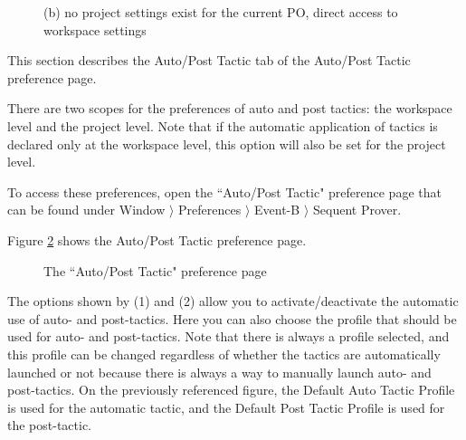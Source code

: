 \begin{figure}
\begin{minipage}[t]{.45\linewidth}
 \centering {}
 \caption{(a) direct access to the Celebrity project specific settings}
 \label{fig_ref_01_proving_perspective13}
\end{minipage}\hfill
\begin{minipage}[t]{.45\linewidth}
\centering {}
\caption{(b) no project settings exist for the current PO, direct access to workspace settings}
 \label{fig_ref_01_proving_perspective14}
\end{minipage}
\end{figure}

This section describes the \textsf{Auto/Post Tactic} tab of the \textsf{Auto/Post Tactic} preference page.

There are two scopes for the preferences of auto and post tactics: the workspace level and the project level. Note that if the automatic application of tactics is declared only at the workspace level, this option will also be set for the project level.

To access these preferences, open the ``Auto/Post Tactic" preference page that can be found under \textsf{Window $\rangle$ Preferences $\rangle$ Event-B $\rangle$ Sequent Prover}.

Figure \ref{fig_ref_01_preferences7} shows the \textsf{Auto/Post Tactic} preference page.

\begin{figure}[!ht]
\begin{center}
	\caption{The ``Auto/Post Tactic" preference page}
	\label{fig_ref_01_preferences7}
\end{center}
\end{figure}

The options shown by (1) and (2) allow you to activate/deactivate the automatic use of auto- and post-tactics. Here you can also choose the profile that should be used for auto- and post-tactics. Note that there is always a profile selected, and this profile can be changed regardless of whether the tactics are automatically launched or not because there is always a way to manually launch auto- and post-tactics. On the previously referenced figure, the \textsf{Default Auto Tactic Profile} is used for the automatic tactic, and the \textsf{Default Post Tactic Profile} is used for the post-tactic.

